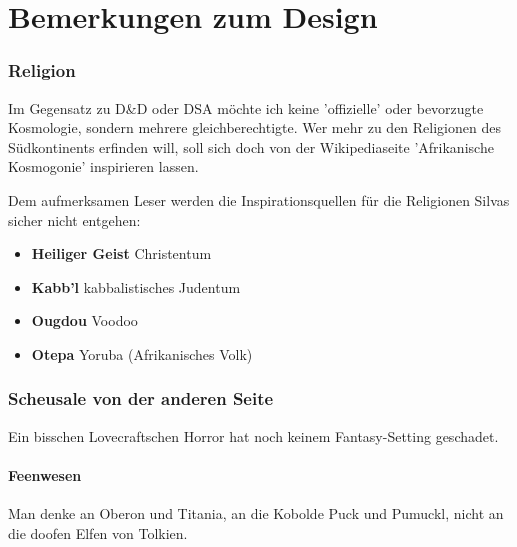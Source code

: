 \documentclass[10pt,twoside,twocolumn,openany]{book}
\begin{document}
%
%	
%
%
%	
%	
%	




\appendix
\chapter{Bemerkungen zum Design}
\subsection{Religion}
Im Gegensatz zu D\&D oder DSA möchte ich keine 'offizielle' oder bevorzugte Kosmologie, sondern mehrere gleichberechtigte. Wer mehr zu den Religionen des Südkontinents erfinden will, soll sich doch von der Wikipediaseite 'Afrikanische Kosmogonie' inspirieren lassen.

Dem aufmerksamen Leser werden die Inspirationsquellen für die Religionen Silvas sicher nicht entgehen:
\begin{itemize}
	\item \textbf{Heiliger Geist} Christentum
	\item \textbf{Kabb'l} kabbalistisches Judentum
	\item \textbf{Ougdou} Voodoo
	\item \textbf{Otepa} Yoruba (Afrikanisches Volk)
\end{itemize}

\subsection{Scheusale von der anderen Seite}
Ein bisschen Lovecraftschen Horror hat noch keinem Fantasy-Setting geschadet.

\subsubsection{Feenwesen}
Man denke an Oberon und Titania, an die Kobolde Puck und Pumuckl, nicht an die doofen Elfen von Tolkien.

\end{document}
